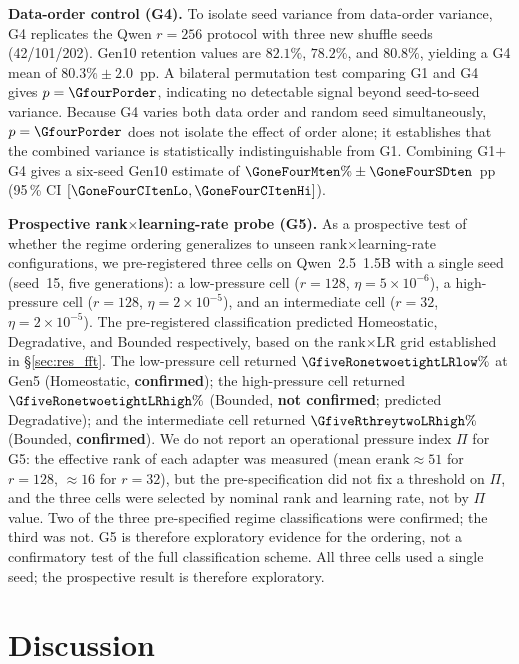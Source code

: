 \documentclass[a4paper,fleqn]{cas-dc}
\newif\ifshowchanges
\newcommand{\rev}[1]{\ifshowchanges{\color{blue}#1}\else{#1}\fi}
\begin{document}
\rev{\textbf{Data-order control (G4).}
To isolate seed variance from data-order variance, G4 replicates the Qwen
$r=256$ protocol with three new shuffle seeds (42/101/202). Gen10 retention
values are $82.1\%$, $78.2\%$, and $80.8\%$, yielding a G4 mean of $\rev{80.3}\%\pm2.0$~pp.
A bilateral permutation test comparing G1 and G4 gives $p=\GfourPorder$, indicating
no detectable signal beyond seed-to-seed variance. Because G4 varies both data
order and random seed simultaneously, $p=\GfourPorder$ does not isolate the
effect of order alone; it establishes that the combined variance is
statistically indistinguishable from G1. Combining G1$+$G4 gives a six-seed
Gen10 estimate of $\GoneFourMten\%\pm\GoneFourSDten$~pp
(95\,\% CI $[\GoneFourCItenLo, \GoneFourCItenHi]$).}

\rev{\textbf{Prospective rank$\times$learning-rate probe (G5).}
As a prospective test of whether the regime ordering generalizes to unseen
rank$\times$learning-rate configurations, we pre-registered three cells on
Qwen~2.5~1.5B with a single seed (seed~15, five generations): a low-pressure
cell ($r=128$, $\eta=5\times10^{-6}$), a high-pressure cell ($r=128$,
$\eta=2\times10^{-5}$), and an intermediate cell ($r=32$, $\eta=2\times10^{-5}$).
The pre-registered classification predicted Homeostatic, Degradative, and
Bounded respectively, based on the rank$\times$LR grid established in
\S\ref{sec:res_fft}.
The low-pressure cell returned $\GfiveRonetwoetightLRlow\%$ at Gen5
(Homeostatic, \textbf{confirmed}); the high-pressure cell returned
$\GfiveRonetwoetightLRhigh\%$ (Bounded, \textbf{not confirmed}; predicted
Degradative); and the intermediate cell returned $\GfiveRthreytwoLRhigh\%$
(Bounded, \textbf{confirmed}).
We do not report an operational pressure index $\Pi$ for G5: the effective rank
of each adapter was measured (mean $\mathrm{erank}\approx51$ for $r=128$,
$\approx16$ for $r=32$), but the pre-specification did not fix a threshold on
$\Pi$, and the three cells were selected by nominal rank and learning rate, not
by $\Pi$ value. \rev{Two of the three pre-specified regime classifications were confirmed; the third was not.} G5 is therefore exploratory evidence for the ordering, not a confirmatory
test of the full classification scheme.
All three cells used a single seed; the prospective result is therefore exploratory.}
\FloatBarrier
\section{Discussion}\label{sec:discussion}
\end{document}
